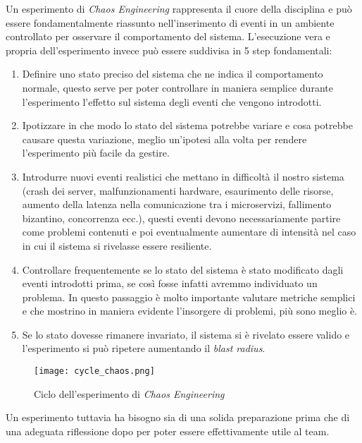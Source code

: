 Un esperimento di \textit{Chaos Engineering} rappresenta il cuore della disciplina e può essere fondamentalmente riassunto nell'inserimento di eventi in un ambiente controllato per osservare il comportamento del sistema.
L'esecuzione vera e propria dell'esperimento invece può essere suddivisa in 5 step fondamentali:
\begin{enumerate}
    \item Definire uno stato preciso del sistema che ne indica il comportamento normale, questo serve per poter controllare in maniera semplice durante l'esperimento l'effetto sul sistema degli eventi che vengono introdotti.
    \item Ipotizzare in che modo lo stato del sistema potrebbe variare e cosa potrebbe causare questa variazione, meglio un'ipotesi alla volta per rendere l'esperimento più facile da gestire.
    \item Introdurre nuovi eventi realistici che mettano in difficoltà il nostro sistema (crash dei server, malfunzionamenti hardware, esaurimento delle risorse, aumento della latenza nella comunicazione tra i microservizi, fallimento bizantino, concorrenza ecc.), questi eventi devono necessariamente partire come problemi contenuti e poi eventualmente aumentare di intensità nel caso in cui il sistema si rivelasse essere resiliente.
    \item Controllare frequentemente se lo stato del sistema è stato modificato dagli eventi introdotti prima, se così fosse infatti avremmo individuato un problema. In questo passaggio è molto importante valutare metriche semplici e che mostrino in maniera evidente l'insorgere di problemi, più sono meglio è.
    \item Se lo stato dovesse rimanere invariato, il sistema si è rivelato essere valido e l'esperimento si può ripetere aumentando il \textit{blast radius}.
\end{enumerate}
\begin{figure}[H]
    \centering
    \texttt{[image: cycle\_chaos.png]}
    \label{tab:cycle_chaos}
    \caption{Ciclo dell'esperimento di \textit{Chaos Engineering}}
\end{figure}
Un esperimento tuttavia ha bisogno sia di una solida preparazione prima che di una adeguata riflessione dopo per poter essere effettivamente utile al team.

